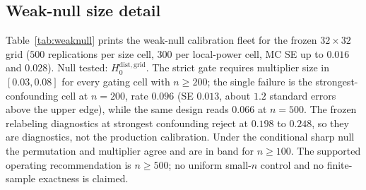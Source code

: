 \subsection{Weak-null size detail}
\label{app:weaknull-tab}

Table~\ref{tab:weaknull} prints the weak-null calibration fleet for the frozen $32\times32$ grid ($500$ replications per size cell, $300$ per local-power cell, MC SE up to $0.016$ and $0.028$). Null tested: $H_0^{\mathrm{dist,grid}}$. The strict gate requires multiplier size in $[0.03,0.08]$ for every gating cell with $n\ge200$; the single failure is the strongest-confounding cell at $n=200$, rate $0.096$ (SE $0.013$, about $1.2$ standard errors above the upper edge), while the same design reads $0.066$ at $n=500$. The frozen relabeling diagnostics at strongest confounding reject at $0.198$ to $0.248$, so they are diagnostics, not the production calibration. Under the conditional sharp null the permutation and multiplier agree and are in band for $n\ge100$. The supported operating recommendation is $n\ge500$; no uniform small-$n$ control and no finite-sample exactness is claimed.


